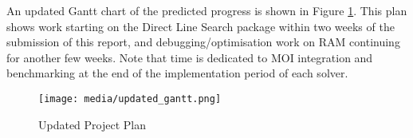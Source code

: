 An updated Gantt chart of the predicted progress is shown in Figure \ref{fig:updated_gantt}. This plan shows work starting on the Direct Line Search package within two weeks of the submission of this report, and debugging/optimisation work on RAM continuing for another few weeks. Note that time is dedicated to MOI integration and benchmarking at the end of the implementation period of each solver. 

\begin{figure}[h]
    \centering
    \texttt{[image: media/updated\_gantt.png]}
    \caption{Updated Project Plan}
    \label{fig:updated_gantt}
\end{figure}